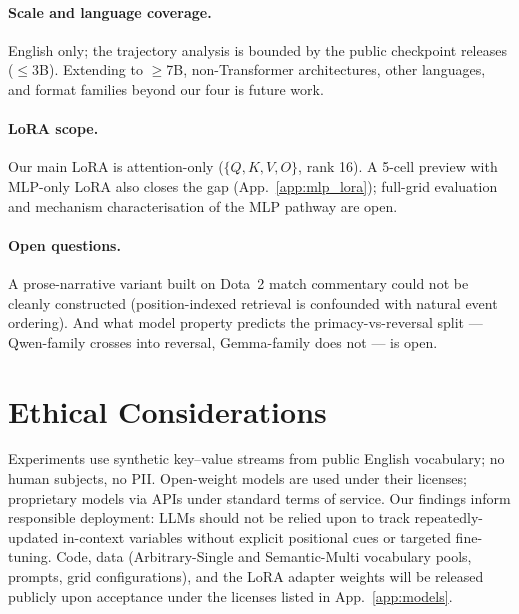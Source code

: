 \documentclass[11pt]{article}
\begin{document}
\paragraph{Scale and language coverage.}
English only; the trajectory analysis is bounded by the public
checkpoint releases ($\leq{}$3B). Extending to $\geq{}$7B,
non-Transformer architectures, other languages, and format families
beyond our four is future work.

\paragraph{LoRA scope.}
Our main LoRA is attention-only ($\{Q, K, V, O\}$, rank 16). A
5-cell preview with MLP-only LoRA also closes the gap
(App.~\ref{app:mlp_lora}); full-grid evaluation and mechanism
characterisation of the MLP pathway are open.

\paragraph{Open questions.}
A prose-narrative variant built on Dota~2 match commentary could
not be cleanly constructed (position-indexed retrieval is confounded
with natural event ordering). And what model property predicts the
primacy-vs-reversal split --- Qwen-family crosses into reversal,
Gemma-family does not --- is open.

\section*{Ethical Considerations}

Experiments use synthetic key--value streams from public English
vocabulary; no human subjects, no PII. Open-weight models are used
under their licenses; proprietary models via APIs under standard
terms of service. Our findings inform responsible deployment: LLMs
should not be relied upon to track repeatedly-updated in-context
variables without explicit positional cues or targeted fine-tuning.
Code, data (Arbitrary-Single and Semantic-Multi vocabulary pools,
prompts, grid configurations), and the LoRA adapter weights will be
released publicly upon acceptance under the licenses listed in
App.~\ref{app:models}.



\appendix

\end{document}
